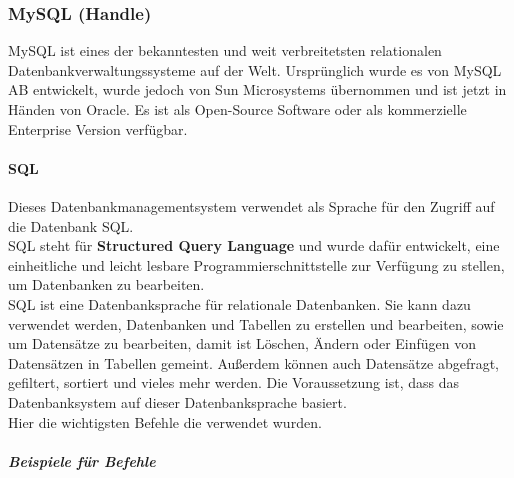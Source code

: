 \subsubsection{MySQL (Handle)}
MySQL ist eines der bekanntesten und weit verbreitetsten relationalen Datenbankverwaltungssysteme auf der Welt. Ursprünglich wurde es von MySQL AB entwickelt, wurde jedoch von Sun Microsystems übernommen und ist jetzt in Händen von Oracle. Es ist als Open-Source Software oder als kommerzielle Enterprise Version verfügbar.\\
\paragraph{SQL}
Dieses Datenbankmanagementsystem verwendet als Sprache für den Zugriff auf die Datenbank SQL.\\
SQL steht für \textbf{Structured Query Language} und wurde dafür entwickelt, eine einheitliche und leicht lesbare Programmierschnittstelle zur Verfügung zu stellen, um Datenbanken zu bearbeiten.\\
SQL ist eine Datenbanksprache für relationale Datenbanken. Sie kann dazu verwendet werden, Datenbanken und Tabellen zu erstellen und bearbeiten, sowie um Datensätze zu bearbeiten, damit ist Löschen, Ändern oder Einfügen von Datensätzen in Tabellen gemeint. Außerdem können auch Datensätze abgefragt, gefiltert, sortiert und vieles mehr werden. Die Voraussetzung ist, dass das Datenbanksystem auf dieser Datenbanksprache basiert.\\
Hier die wichtigsten Befehle die verwendet wurden.\\
\subparagraph{Beispiele für Befehle}
